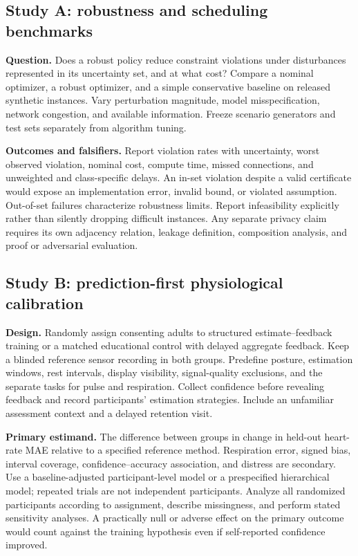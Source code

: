 \subsection{Study A: robustness and scheduling benchmarks}
\textbf{Question.} Does a robust policy reduce constraint violations under disturbances represented in its uncertainty set, and at what cost? Compare a nominal optimizer, a robust optimizer, and a simple conservative baseline on released synthetic instances. Vary perturbation magnitude, model misspecification, network congestion, and available information. Freeze scenario generators and test sets separately from algorithm tuning.

\textbf{Outcomes and falsifiers.} Report violation rates with uncertainty, worst observed violation, nominal cost, compute time, missed connections, and unweighted and class-specific delays. An in-set violation despite a valid certificate would expose an implementation error, invalid bound, or violated assumption. Out-of-set failures characterize robustness limits. Report infeasibility explicitly rather than silently dropping difficult instances. Any separate privacy claim requires its own adjacency relation, leakage definition, composition analysis, and proof or adversarial evaluation.

\subsection{Study B: prediction-first physiological calibration}
\textbf{Design.} Randomly assign consenting adults to structured estimate--feedback training or a matched educational control with delayed aggregate feedback. Keep a blinded reference sensor recording in both groups. Predefine posture, estimation windows, rest intervals, display visibility, signal-quality exclusions, and the separate tasks for pulse and respiration. Collect confidence before revealing feedback and record participants' estimation strategies. Include an unfamiliar assessment context and a delayed retention visit.

\textbf{Primary estimand.} The difference between groups in change in held-out heart-rate MAE relative to a specified reference method. Respiration error, signed bias, interval coverage, confidence--accuracy association, and distress are secondary. Use a baseline-adjusted participant-level model or a prespecified hierarchical model; repeated trials are not independent participants. Analyze all randomized participants according to assignment, describe missingness, and perform stated sensitivity analyses. A practically null or adverse effect on the primary outcome would count against the training hypothesis even if self-reported confidence improved.

